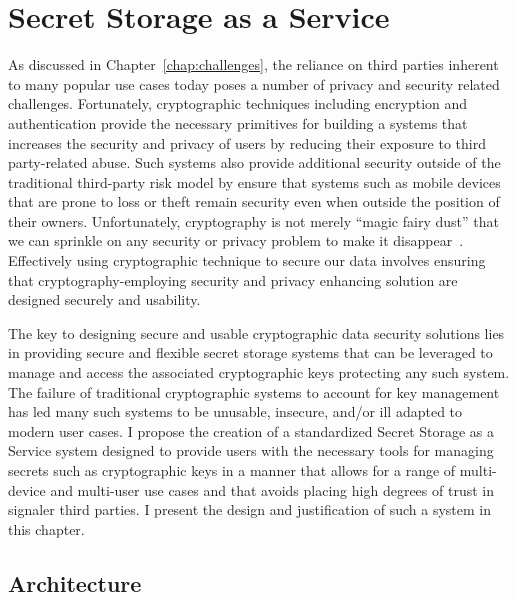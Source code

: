 \chapter{Secret Storage as a Service}
\label{chap:ssaas}

As discussed in Chapter~\ref{chap:challenges}, the reliance on third
parties inherent to many popular use cases today poses a number of
privacy and security related challenges. Fortunately, cryptographic
techniques including encryption and authentication provide the
necessary primitives for building a systems that increases the
security and privacy of users by reducing their exposure to third
party-related abuse. Such systems also provide additional security
outside of the traditional third-party risk model by ensure that
systems such as mobile devices that are prone to loss or theft remain
security even when outside the position of their
owners. Unfortunately, cryptography is not merely ``magic fairy dust''
that we can sprinkle on any security or privacy problem to make it
disappear~\cite{smith2003}. Effectively using cryptographic technique
to secure our data involves ensuring that cryptography-employing
security and privacy enhancing solution are designed securely and
usability.

The key to designing secure and usable cryptographic data security
solutions lies in providing secure and flexible secret storage systems
that can be leveraged to manage and access the associated
cryptographic keys protecting any such system. The failure of
traditional cryptographic systems to account for key management has
led many such systems to be unusable, insecure, and/or ill adapted to
modern user cases. I propose the creation of a standardized Secret
Storage as a Service system designed to provide users with the
necessary tools for managing secrets such as cryptographic keys in a
manner that allows for a range of multi-device and multi-user use
cases and that avoids placing high degrees of trust in signaler third
parties. I present the design and justification of such a system in
this chapter.

\section{Architecture}
\label{chap:ssaas:arch}

